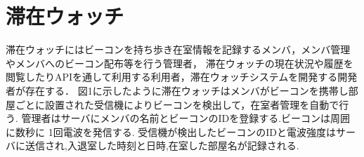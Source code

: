 
\section{滞在ウォッチ}
\label{sec:const}
滞在ウォッチにはビーコンを持ち歩き在室情報を記録するメンバ，メンバ管理やメンバへのビーコン配布等を行う管理者，
滞在ウォッチの現在状況や履歴を閲覧したりAPIを通して利用する利用者，滞在ウォッチシステムを開発する開発者が存在する．
図1に示したように滞在ウォッチはメンバがビーコンを携帯し部屋ごとに設置された受信機によりビーコンを検出して，在室者管理を自動で行う.
管理者はサーバにメンバの名前とビーコンのIDを登録する.ビーコンは周囲に数秒に 1回電波を発信する.
受信機が検出したビーコンのIDと電波強度はサーバに送信され,入退室した時刻と日時,在室した部屋名が記録される.



